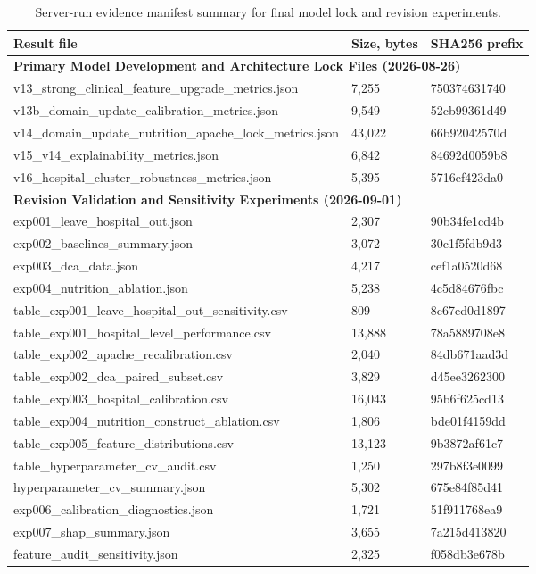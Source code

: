 \documentclass[utf8]{frontiers_suppmat}
\begin{document}
\begin{table}[!htbp]
\centering
\caption{Server-run evidence manifest summary for final model lock and revision experiments.}
\label{tab:manifest_s10}
\small
\begin{tabular}{lll}
\toprule
Result file & Size, bytes & SHA256 prefix\\
\midrule
\multicolumn{3}{l}{\textbf{Primary Model Development and Architecture Lock Files (2026-08-26)}}\\
v13\_strong\_clinical\_feature\_upgrade\_metrics.json & 7,255 & 750374631740\\
v13b\_domain\_update\_calibration\_metrics.json & 9,549 & 52cb99361d49\\
v14\_domain\_update\_nutrition\_apache\_lock\_metrics.json & 43,022 & 66b92042570d\\
v15\_v14\_explainability\_metrics.json & 6,842 & 84692d0059b8\\
v16\_hospital\_cluster\_robustness\_metrics.json & 5,395 & 5716ef423da0\\
\midrule
\multicolumn{3}{l}{\textbf{Revision Validation and Sensitivity Experiments (2026-09-01)}}\\
exp001\_leave\_hospital\_out.json & 2,307 & 90b34fe1cd4b\\
exp002\_baselines\_summary.json & 3,072 & 30c1f5fdb9d3\\
exp003\_dca\_data.json & 4,217 & cef1a0520d68\\
exp004\_nutrition\_ablation.json & 5,238 & 4c5d84676fbc\\
table\_exp001\_leave\_hospital\_out\_sensitivity.csv & 809 & 8c67ed0d1897\\
table\_exp001\_hospital\_level\_performance.csv & 13,888 & 78a5889708e8\\
table\_exp002\_apache\_recalibration.csv & 2,040 & 84db671aad3d\\
table\_exp002\_dca\_paired\_subset.csv & 3,829 & d45ee3262300\\
table\_exp003\_hospital\_calibration.csv & 16,043 & 95b6f625cd13\\
table\_exp004\_nutrition\_construct\_ablation.csv & 1,806 & bde01f4159dd\\
table\_exp005\_feature\_distributions.csv & 13,123 & 9b3872af61c7\\
table\_hyperparameter\_cv\_audit.csv & 1,250 & 297b8f3e0099\\
hyperparameter\_cv\_summary.json & 5,302 & 675e84f85d41\\
exp006\_calibration\_diagnostics.json & 1,721 & 51f911768ea9\\
exp007\_shap\_summary.json & 3,655 & 7a215d413820\\
feature\_audit\_sensitivity.json & 2,325 & f058db3e678b\\
\bottomrule
\end{tabular}
\end{table}
\end{document}
